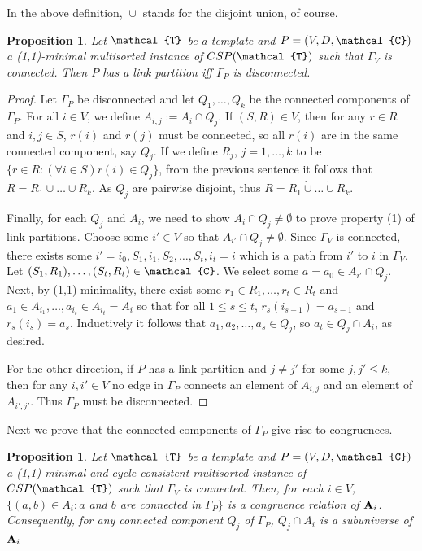 \documentclass[11pt]{amsart}
\newcommand{\m}[1]{{\uppercase {\mathbf {#1}}}}
\newcommand{\vr}[1]{{\uppercase {\mathcal{#1}}}}
\newtheorem{prp}[thm]{Proposition}
\theoremstyle{definition}
\begin{document}
In the above definition, $\dot{\cup}$ stands for the disjoint union, of course.

\begin{prp}
Let $\vr t$ be a template and $P=(V,D,\vr c)$ a (1,1)-minimal multisorted instance of $CSP(\vr t)$ such that $\Gamma_V$ is connected. Then $P$ has a link partition iff $\Gamma_P$ is disconnected.
\end{prp}

\begin{proof}
Let $\Gamma_P$ be disconnected and let $Q_1,\dots,Q_k$ be the connected components of $\Gamma_P$. For all $i\in V$, we define $A_{i,j}:=A_i\cap Q_j$. If $(S,R)\in V$, then for any $r\in R$ and $i,j\in S$, $r(i)$ and $r(j)$ must be connected, so all $r(i)$ are in the same connected component, say $Q_j$. If we define $R_j$, $j=1,\dots,k$ to be $\{r\in R:(\forall i\in S)r(i)\in Q_j\}$, from the previous sentence it follows that $R=R_1\cup\dots\cup R_k$. As $Q_j$ are pairwise disjoint, thus $R=R_1\dot{\cup}\dots\dot{\cup}R_k$. 

Finally, for each $Q_j$ and $A_i$, we need to show $A_i\cap Q_j\neq\emptyset$ to prove property (1) of link partitions. Choose some $i'\in V$ so that $A_{i'}\cap Q_j\neq\emptyset$. Since $\Gamma_V$ is connected, there exists some $i'=i_0, S_1,i_1,S_2,\dots,S_t,i_t=i$ which is a path from $i'$ to $i$ in $\Gamma_V$. Let $(S_1,R_1), \dots ,(S_t,R_t)\in \vr c$. We select some $a=a_0\in A_{i'}\cap Q_j$. Next, by (1,1)-minimality, there exist some $r_1\in R_1,\dots,r_t\in R_t$ and $a_1\in A_{i_1},\dots,a_{i_t}\in A_{i_t}=A_i $ so that for all $1\leq s\leq t$, $r_s(i_{s-1})=a_{s-1}$ and $r_s(i_s)=a_s$. Inductively it follows that $a_1,a_2,\dots,a_s\in Q_j$, so $a_t\in Q_j\cap A_i$, as desired.

For the other direction, if $P$ has a link partition and $j\neq j'$ for some $j,j'\leq k$, then for any $i,i'\in V$ no edge in $\Gamma_P$ connects an element of $A_{i,j}$ and an element of $A_{i',j'}$. Thus $\Gamma_P$ must be disconnected.
\end{proof}

Next we prove that the connected components of $\Gamma_P$ give rise to congruences.

\begin{prp}\label{linksubuniv}
Let $\vr t$ be a template and $P=(V,D,\vr c)$ a (1,1)-minimal and cycle consistent multisorted instance of $CSP(\vr t)$ such that $\Gamma_V$ is connected. Then, for each $i\in V$, $\{(a,b)\in A_i:a$ and $b$ are connected in $\Gamma_P\}$ is a congruence relation of $\m a_i$. Consequently, for any connected component $Q_j$ of $\Gamma_P$, $Q_j\cap A_i$ is a subuniverse of $\m a_i$
\end{prp}
\end{document}

